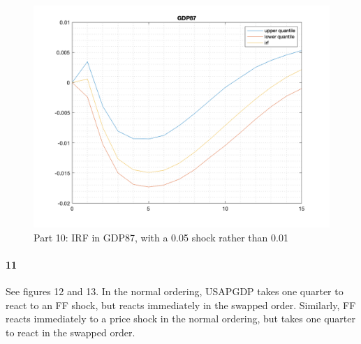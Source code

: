 \documentclass[10pt,letter]{article}
\newcommand{\problempart}[1]{\paragraph{#1}}
\begin{document}
\begin{figure}
\begin{center}
\includegraphics[width=15cm]{ps9fig11}
\caption{Part 10: IRF in GDP87, with a 0.05 shock rather than 0.01}
\end{center}
\end{figure}
\problempart{11} See figures 12 and 13. In the normal ordering, USAPGDP takes one quarter to react to an FF shock, but reacts immediately in the swapped order. Similarly, FF reacts immediately to a price shock in the normal ordering, but takes one quarter to react in the swapped order.
\end{document}
